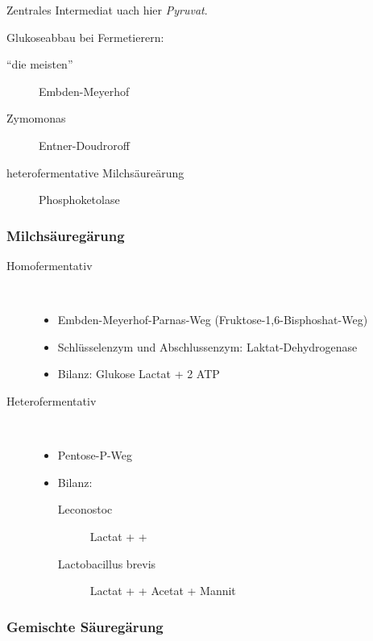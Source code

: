 Zentrales Intermediat uach hier \textsl{Pyruvat}.

Glukoseabbau bei Fermetierern:
\begin{description}
	\item[``die meisten''] Embden-Meyerhof
	\item[Zymomonas]Entner-Doudroroff 
	\item[heterofermentative Milchsäureärung] Phosphoketolase
\end{description}


\subsubsection{Milchsäuregärung}

\begin{description}
	\item[Homofermentativ]	\hfill	\\
		\begin{itemize}
			\item Embden-Meyerhof-Parnas-Weg (Fruktose-1,6-Bisphoshat-Weg)
			\item Schlüsselenzym und Abschlussenzym: Laktat-Dehydrogenase
			\item Bilanz: Glukose  Lactat + 2 ATP
		\end{itemize}

	\item[Heterofermentativ]	\hfill	\\
		\begin{itemize}
			\item Pentose-P-Weg
			\item Bilanz:
				\begin{description}
					\item[Leconostoc] Lactat +  + 
					\item[Lactobacillus brevis] Lactat +  + Acetat + Mannit
				\end{description}
		\end{itemize}
\end{description}

\subsubsection{Gemischte Säuregärung}

